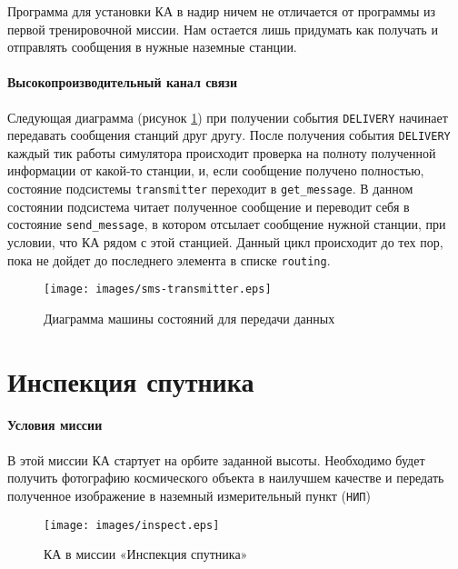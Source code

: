 \documentclass[12pt,a4paper]{article}
\begin{document}
Программа для установки КА в надир ничем не отличается от программы из первой тренировочной миссии. Нам остается лишь придумать как получать и отправлять сообщения в нужные наземные станции.

\paragraph{Высокопроизводительный канал связи} Следующая диаграмма (рисунок \ref{Pic:SMS-transmitter}) при получении события \verb'DELIVERY' начинает передавать сообщения станций друг другу. После получения события \verb'DELIVERY' каждый тик работы симулятора происходит проверка на полноту полученной информации от какой-то станции, и, если сообщение получено полностью, состояние подсистемы \verb'transmitter' переходит в \verb'get_message'. В данном состоянии подсистема читает полученное сообщение и переводит себя в состояние \verb'send_message', в котором отсылает сообщение нужной станции, при условии, что КА рядом с этой станцией. Данный цикл происходит до тех пор, пока не дойдет до последнего элемента в списке \verb'routing'.

\begin{figure}[tbh]
  \begin{center}
    \texttt{[image: images/sms-transmitter.eps]}
    \caption{Диаграмма машины состояний для передачи данных}
    \label{Pic:SMS-transmitter}
  \end{center}
\end{figure}

\section{Инспекция спутника}

\paragraph{Условия миссии} В этой миссии КА стартует на орбите
заданной высоты. Необходимо будет получить фотографию космического объекта в наилучшем качестве и передать полученное изображение в наземный измерительный пункт (\verb'НИП')

\begin{figure}[tbh]
  \begin{center}
    \texttt{[image: images/inspect.eps]}
    \caption{КА в миссии «Инспекция спутника»}
    \label{Pic:Inspection}
  \end{center}
\end{figure}
\end{document}
